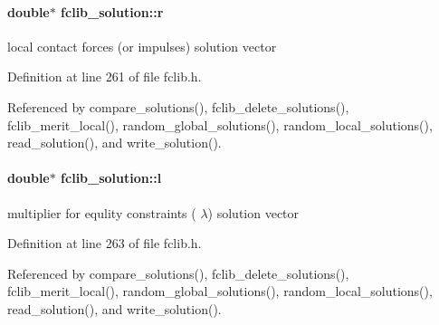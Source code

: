 \hypertarget{structfclib__solution_aba0437aebbb1060350ef2f0a6e8b504d}{}
\paragraph[{r}]{\setlength{\rightskip}{0pt plus 5cm}double$\ast$ fclib\+\_\+solution\+::r}\label{structfclib__solution_aba0437aebbb1060350ef2f0a6e8b504d}


local contact forces (or impulses) solution vector 



Definition at line 261 of file fclib.\+h.



Referenced by compare\+\_\+solutions(), fclib\+\_\+delete\+\_\+solutions(), fclib\+\_\+merit\+\_\+local(), random\+\_\+global\+\_\+solutions(), random\+\_\+local\+\_\+solutions(), read\+\_\+solution(), and write\+\_\+solution().

\hypertarget{structfclib__solution_a872a687856540dd19286aec43d890ede}{}
\paragraph[{l}]{\setlength{\rightskip}{0pt plus 5cm}double$\ast$ fclib\+\_\+solution\+::l}\label{structfclib__solution_a872a687856540dd19286aec43d890ede}


multiplier for equlity constraints ( $\lambda$) solution vector 



Definition at line 263 of file fclib.\+h.



Referenced by compare\+\_\+solutions(), fclib\+\_\+delete\+\_\+solutions(), fclib\+\_\+merit\+\_\+local(), random\+\_\+global\+\_\+solutions(), random\+\_\+local\+\_\+solutions(), read\+\_\+solution(), and write\+\_\+solution().

